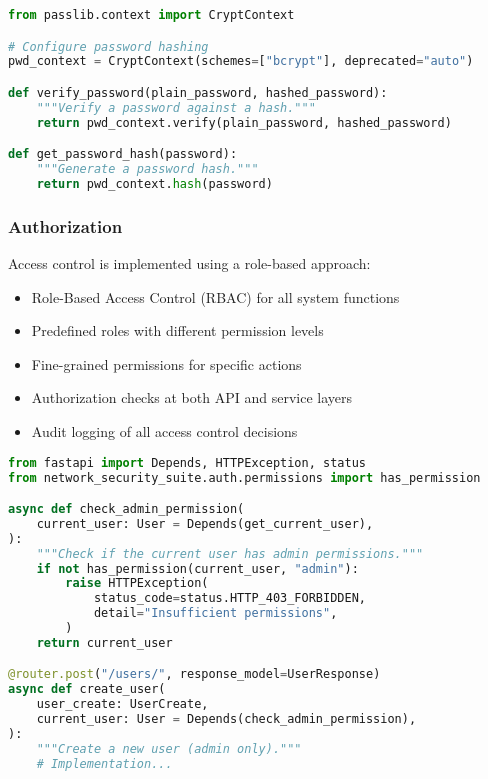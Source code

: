 \begin{lstlisting}[language=python, caption=Password Hashing Example]
from passlib.context import CryptContext

# Configure password hashing
pwd_context = CryptContext(schemes=["bcrypt"], deprecated="auto")

def verify_password(plain_password, hashed_password):
    """Verify a password against a hash."""
    return pwd_context.verify(plain_password, hashed_password)

def get_password_hash(password):
    """Generate a password hash."""
    return pwd_context.hash(password)
\end{lstlisting}

\subsubsection{Authorization}
Access control is implemented using a role-based approach:

\begin{itemize}
    \item Role-Based Access Control (RBAC) for all system functions
    \item Predefined roles with different permission levels
    \item Fine-grained permissions for specific actions
    \item Authorization checks at both API and service layers
    \item Audit logging of all access control decisions
\end{itemize}

\begin{lstlisting}[language=python, caption=Authorization Check Example]
from fastapi import Depends, HTTPException, status
from network_security_suite.auth.permissions import has_permission

async def check_admin_permission(
    current_user: User = Depends(get_current_user),
):
    """Check if the current user has admin permissions."""
    if not has_permission(current_user, "admin"):
        raise HTTPException(
            status_code=status.HTTP_403_FORBIDDEN,
            detail="Insufficient permissions",
        )
    return current_user

@router.post("/users/", response_model=UserResponse)
async def create_user(
    user_create: UserCreate,
    current_user: User = Depends(check_admin_permission),
):
    """Create a new user (admin only)."""
    # Implementation...
\end{lstlisting}

